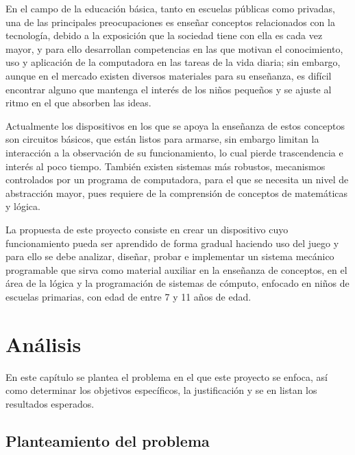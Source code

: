 \documentclass[letterpaper,10pt]{article}
\begin{document}
En el campo de la educación básica, 
tanto en escuelas públicas como privadas, 
una de las principales preocupaciones es enseñar conceptos relacionados 
con la tecnología, debido a la exposición que la sociedad tiene 
con ella es cada vez mayor, y para ello desarrollan competencias
en las 
que motivan el conocimiento, uso y aplicación de la computadora en las tareas 
de la vida diaria; sin embargo, aunque 
en el mercado existen diversos materiales 
para su enseñanza, es difícil encontrar alguno que mantenga el interés de los niños 
pequeños y se ajuste al ritmo en el que absorben las ideas.

Actualmente los dispositivos en los que se apoya la enseñanza de estos 
conceptos son circuitos básicos, que están listos para armarse, sin embargo 
limitan la interacción a la observación de su funcionamiento, 
lo cual pierde trascendencia e interés al poco tiempo. También existen 
sistemas más robustos, mecanismos controlados por un programa de computadora, 
para el que se necesita un nivel de abstracción mayor, 
pues requiere de la comprensión de conceptos de matemáticas y lógica.

La propuesta de este proyecto consiste en crear un dispositivo cuyo 
funcionamiento pueda ser aprendido de forma gradual 
haciendo uso del juego y para ello se debe analizar, 
diseñar, probar e implementar un sistema mecánico programable que sirva como 
material auxiliar en la enseñanza de conceptos, en el área de la lógica
y la programación de sistemas de cómputo, enfocado en niños de escuelas primarias,
con edad de entre 7 y 11 años de edad.

\section{Análisis}
En este capítulo se plantea el problema en el que este proyecto se enfoca, así como
determinar los objetivos específicos, la justificación y se en listan los resultados esperados.
\newline

\subsection{Planteamiento del problema}
\end{document}
